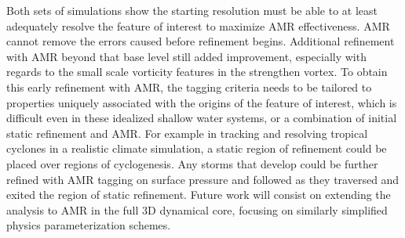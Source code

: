 Both sets of simulations show the starting resolution must be
able to at least adequately resolve the feature of interest to maximize
AMR effectiveness.  AMR cannot remove the errors
caused before refinement begins. Additional refinement with
AMR beyond that base level still added improvement, especially
with regards to the small scale vorticity features in the strengthen vortex.
To obtain this early refinement with AMR, the tagging
criteria needs to be tailored to properties uniquely associated
with the origins of the feature of interest, which is difficult even in these 
idealized shallow water systems, or a combination of initial static refinement 
and AMR. For example in tracking and resolving tropical
cyclones in a realistic climate simulation, a static region of refinement
could be placed over regions of cyclogenesis. Any storms that
develop could be further refined with AMR tagging on
surface pressure and followed as they traversed
and exited the region of static refinement.
Future work will consist on extending the analysis
to AMR in the full 3D dynamical core, focusing on
similarly simplified physics parameterization schemes.

